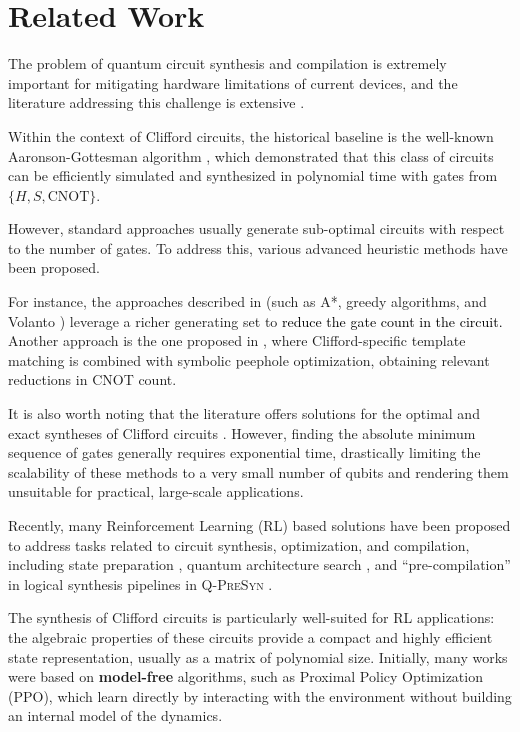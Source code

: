 \documentclass[conference]{IEEEtran}
\newcommand{\nt}[1]{\textcolor{black}{#1}}
\begin{document}
\section{Related Work}
\label{sec:RL}


The problem of quantum circuit synthesis and compilation is extremely important for mitigating  hardware limitations of current devices, and the literature addressing this challenge is extensive \cite{yan2024quantum}.

Within the context of Clifford circuits, the historical baseline is the well-known Aaronson-Gottesman algorithm \cite{AG_for_clifford}, which demonstrated that this class of circuits can be efficiently simulated and synthesized in polynomial time with gates from $\{H, S, \text{CNOT}\}$.

However, standard approaches usually generate sub-optimal circuits with respect to the number of gates. To address this, various advanced heuristic methods have been proposed. 


For instance, the approaches described in \cite{webster} (such as A*, greedy algorithms, and Volanto \cite{volanto}) leverage a richer generating set to \nt{reduce the gate count in the circuit.} Another approach is the one proposed in \cite{Bravyi2021cliffordcircuit}, where Clifford-specific template matching is combined with symbolic peephole optimization, obtaining relevant reductions in CNOT count.

It is also worth noting that the literature offers solutions for the optimal and exact syntheses of Clifford circuits \cite{bravyi2022optimalclifford, shaik2025cnotoptimal}. However, finding the absolute minimum sequence of gates generally requires exponential time, drastically limiting the scalability of these methods to a very small number of qubits and rendering them unsuitable for practical, large-scale applications.



Recently, many  Reinforcement Learning (RL) based solutions have been proposed to address tasks related to circuit synthesis, optimization, and compilation, including state preparation \cite{Kundu_2025}, quantum architecture search \cite{kundu_tensorrl_qas},  and “pre-compilation” in logical synthesis pipelines in \textsc{Q-PreSyn} \cite{qpresyn}.



The synthesis of Clifford circuits is particularly well-suited for RL applications: the algebraic properties of these circuits provide a compact and highly efficient state representation, usually as a matrix of polynomial size.
Initially, many works were based on \textbf{model-free} algorithms, such as  Proximal Policy Optimization \cite{schulman2017ppo} (PPO), which learn directly by interacting with the environment without building an internal model of the dynamics. 
\end{document}
